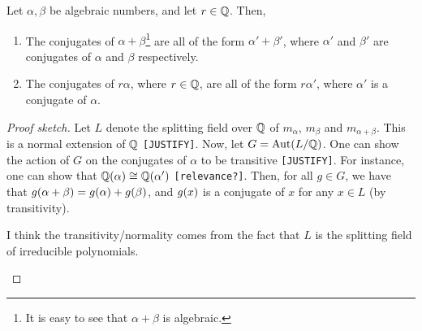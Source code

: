 \begin{lemma}
    Let $\alpha, \beta$ be algebraic numbers, and let $r \in \mathbb{Q}$. Then,
    \begin{enumerate}[label = \normalfont \arabic*., noitemsep]
        \item The conjugates of $\alpha + \beta$\footnote{It is easy to see that $\alpha + \beta$ is algebraic.} are all of the form $\alpha' + \beta'$, where $\alpha'$ and $\beta'$ are conjugates of $\alpha$ and $\beta$ respectively.
        \item The conjugates of $r\alpha$, where $r \in \mathbb{Q}$, are all of the form $r \alpha'$, where $\alpha'$ is a conjugate of $\alpha$.
    \end{enumerate}
\end{lemma}
\begin{proof}[Proof sketch]
    Let $L$ denote the splitting field over $\mathbb{Q}$ of $m_{\alpha}$, $m_{\beta}$ and $m_{\alpha + \beta}$. This is a normal extension of $\mathbb{Q}$ \verb|[JUSTIFY]|. Now, let $G = \operatorname{Aut}\!\left( L/\mathbb{Q} \right)$. One can show the action of $G$ on the conjugates of $\alpha$ to be transitive \verb|[JUSTIFY]|. For instance, one can show that $\mathbb{Q}(\alpha) \cong \mathbb{Q}\!\left( \alpha' \right)$ \verb|[relevance?]|. Then, for all $g \in G$, we have that $g\!\left( \alpha + \beta \right) = g\!\left( \alpha \right) + g\!\left( \beta \right)$, and $g\!\left( x \right)$ is a conjugate of $x$ for any $x \in L$ (by transitivity).
    \begin{textit} I think the transitivity/normality comes from the fact that $L$ is the splitting field of irreducible polynomials. \end{textit}
\end{proof}

